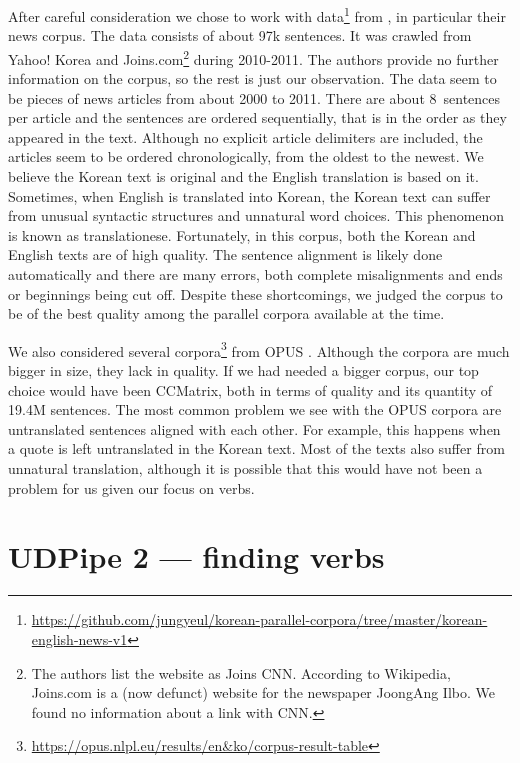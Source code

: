 After careful consideration we chose to work with data\footnote{\url{https://github.com/jungyeul/korean-parallel-corpora/tree/master/korean-english-news-v1}}  from \citet{park-etal-2016-korean}, in particular their news corpus. The data consists of about 97k sentences. It was crawled from Yahoo! Korea and Joins.com\footnote{The authors list the website as Joins CNN. According to Wikipedia, Joins.com is a (now defunct) website for the newspaper JoongAng Ilbo. We found no information about a link with CNN.} during 2010-2011. The authors provide no further information on the corpus, so the rest is just our observation. The data seem to be pieces of news articles from about 2000 to 2011. There are about 8~sentences per article and the sentences are ordered sequentially, that is in the order as they appeared in the text. Although no explicit article delimiters are included, the articles seem to be ordered chronologically, from the oldest to the newest. We believe the Korean text is original and the English translation is based on it. Sometimes, when English is translated into Korean, the Korean text can suffer from unusual syntactic structures and unnatural word choices. This phenomenon is known as translationese. Fortunately, in this corpus, both the Korean and English texts are of high quality. The sentence alignment is likely done automatically and there are many errors, both complete misalignments and ends or beginnings being cut off. Despite these shortcomings, we judged the corpus to be of the best quality among the parallel corpora available at the time.

We also considered several corpora\footnote{\url{https://opus.nlpl.eu/results/en&ko/corpus-result-table}} from OPUS \parencite{opus}. Although the corpora are much bigger in size, they lack in quality. If we had needed a bigger corpus, our top choice would have been CCMatrix, both in terms of quality and its quantity of 19.4M sentences. The most common problem we see with the OPUS corpora are untranslated sentences aligned with each other. For example, this happens when a quote is left untranslated in the Korean text. Most of the texts also suffer from unnatural translation, although it is possible that this would have not been a problem for us given our focus on verbs.

\section{UDPipe 2 --- finding verbs}

